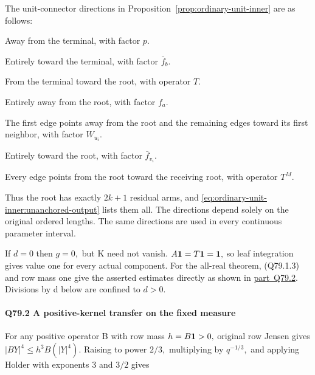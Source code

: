 The unit-connector directions in Proposition~\ref{prop:ordinary-unit-inner} are as follows:

\begin{description}[style=nextline,leftmargin=1.6em]
\item[{Terminal unit arm}] Away from the terminal, with factor \(p\).
\item[{Terminal \(b\)-arm}] Entirely toward the terminal, with factor \(\bar f_b\).
\item[{Unit inner connector}] From the terminal toward the root, with operator \(T\).
\item[{Root shortest arm \(a\)}] Entirely away from the root, with factor \(f_a\).
\item[{Root arm \(u_i\)}] The first edge points away from the root and the remaining edges toward its first neighbor, with factor \(W_{u_i}\).
\item[{Root arm \(v_i\)}] Entirely toward the root, with factor \(\bar f_{v_i}\).
\item[{Outer path of length \(M\)}] Every edge points from the root toward the receiving root, with operator \(T^M\).
\end{description}

Thus the root has exactly $2k+1$ residual arms, and \eqref{eq:ordinary-unit-inner:unanchored-output} lists them all.
The directions depend solely on the original ordered lengths. The
same directions are used in every continuous parameter interval.

If \(d=0\) then \(g=0,\allowbreak \) but K need not vanish. \(A\mathbf1=T\mathbf1=\mathbf1,\allowbreak \) so leaf integration
gives value one for every actual component. For the all-real theorem,
(Q79.1.3) and row mass one give the asserted estimates directly as shown
in \mbox{\hyperref[part:Q79.2]{part Q79.2}}. Divisions by d below are confined to \(d>0.\)

\paragraph{Q79.2 A positive-kernel transfer on the fixed measure}\label{part:Q79.2}

For any positive operator B with row mass \(h=B\mathbf1>0,\allowbreak \) original row Jensen
gives \(|BY|^4\le h^3 B(|Y|^4).\) Raising to power \(2/3,\allowbreak \) multiplying by
\(q^{-1/3},\allowbreak \) and applying Holder with exponents 3 and \(3/2\) gives



